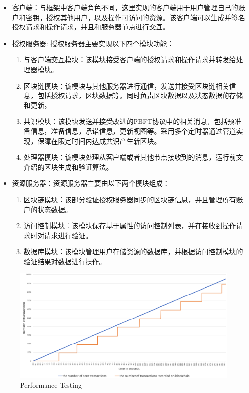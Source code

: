 \begin{itemize}
  \item 客户端：与框架中客户端角色不同，这里实现的客户端用于用户管理自己的账户和密钥，授权其他用户，以及操作可访问的资源。该客户端可以生成并签名授权请求和操作请求，并且和服务器节点进行交互。
  \item 授权服务器: 授权服务器主要实现以下四个模块功能：
    \begin{enumerate}
      \item 与客户端交互模块：该模块接受客户端的授权请求和操作请求并转发给处理器模块。
      \item 区块链模块：该模块与其他服务器进行通信，发送并接受区块链相关信息，包括授权请求，区块数据等。同时负责区块数据以及状态数据的存储和更新。
      \item 共识模块：该模块发送并接受改进的PBFT协议中的相关消息，包括预准备信息，准备信息，承诺信息，更新视图等。采用多个定时器通过管道实现，保障在限定时间内达成共识产生新区块。
      \item 处理器模块：该模块处理从客户端或者其他节点接收到的消息，运行前文介绍的区块生成和验证算法。
    \end{enumerate}
  \item 资源服务器：资源服务器主要由以下两个模块组成：
    \begin{enumerate}
      \item 区块链模块：该部分验证授权服务器同步的区块链信息，并且管理所有账户的状态数据。
      \item 访问控制模块：该模块保存基于属性的访问控制列表，并在接收到操作请求时对请求进行验证。
      \item 数据库模块：该模块管理用户存储资源的数据库，并根据访问控制模块的验证结果对数据进行操作。
    \end{enumerate}
\end{itemize}

\begin{figure}
\centering
\includegraphics[width=12cm, keepaspectratio]{figures/performance.png}
\caption{Performance Testing}
\label{fig:performance}
\end{figure}

